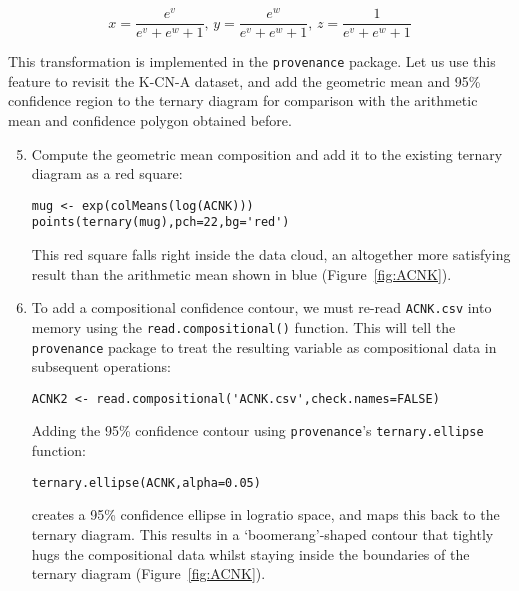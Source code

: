 \documentclass[11pt]{article}
\begin{document}
\begin{equation}
  x = \frac{e^v}{e^v + e^w + 1} \mbox{,~} y = \frac{e^w}{e^v + e^w +
    1} \mbox{,~} z = \frac{1}{e^v + e^w + 1}
\end{equation}

This transformation is implemented in the \texttt{provenance} package.
Let us use this feature to revisit the K-CN-A dataset, and add the
geometric mean and 95\% confidence region to the ternary diagram for
comparison with the arithmetic mean and confidence polygon obtained
before.

\begin{enumerate}
\setcounter{enumi}{4}
\item Compute the geometric mean composition and add it to the
  existing ternary diagram as a red square:

\begin{verbatim}
mug <- exp(colMeans(log(ACNK)))
points(ternary(mug),pch=22,bg='red')
\end{verbatim}

This red square falls right inside the data cloud, an altogether more
satisfying result than the arithmetic mean shown in blue
(Figure~\ref{fig:ACNK}).

\item\label{itm:ternarycontour} To add a compositional confidence
  contour, we must re-read \texttt{ACNK.csv} into memory using the
  \texttt{read.compositional()} function.  This will tell the
  \texttt{provenance} package to treat the resulting variable as
  compositional data in subsequent operations:

\begin{verbatim}
ACNK2 <- read.compositional('ACNK.csv',check.names=FALSE)
\end{verbatim}

Adding the 95\% confidence contour using \texttt{provenance}'s
\texttt{ternary.ellipse} function:

\begin{verbatim}
ternary.ellipse(ACNK,alpha=0.05)
\end{verbatim}

creates a 95\% confidence ellipse in logratio space, and maps this
back to the ternary diagram. This results in a `boomerang'-shaped
contour that tightly hugs the compositional data whilst staying inside
the boundaries of the ternary diagram (Figure~\ref{fig:ACNK}).

\end{enumerate}
\end{document}
